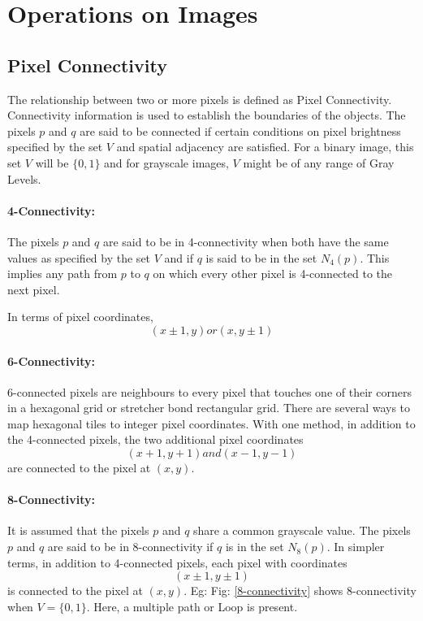 \chapter{Operations on Images}

\section{Pixel Connectivity}
The relationship between two or more pixels is defined as Pixel Connectivity.
Connectivity information is used to establish the boundaries of the objects.
The pixels $p$ and $q$ are said to be connected if certain conditions on pixel brightness specified by the set $V$ and spatial adjacency are satisfied.
For a binary image, this set $V$ will be $\{0,1\}$ and for grayscale images, $V$ might be of any range of Gray Levels.

\subsubsection{4-Connectivity:}
The pixels $p$ and $q$ are said to be in 4-connectivity when both have the same values as specified by the set $V$ and if $q$ is said to be in the set $N_4(p)$. This implies any path from $p$ to $q$ on which every other pixel is 4-connected to the next pixel.

In terms of pixel coordinates,
$$(x \pm 1, y) or (x, y \pm 1)$$

\subsubsection{6-Connectivity:}

6-connected pixels are neighbours to every pixel that touches one of their corners in a hexagonal grid or stretcher bond rectangular grid.
There are several ways to map hexagonal tiles to integer pixel coordinates.
With one method, in addition to the 4-connected pixels, the two additional pixel coordinates $$(x+1, y+1) and (x-1, y-1)$$ are connected to the pixel at $(x,y)$.

\subsubsection{8-Connectivity:}
It is assumed that the pixels $p$ and $q$ share a common grayscale value. The pixels $p$ and $q$ are said to be in 8-connectivity if $q$ is in the set $N_8(p)$.
In simpler terms, in addition to 4-connected pixels, each pixel with coordinates $$(x \pm 1, y \pm 1)$$ is connected to the pixel at $(x,y)$.
Eg: Fig: \ref{8-connectivity} shows 8-connectivity when $V = \{0,1\}$. Here, a multiple path or Loop is present.


